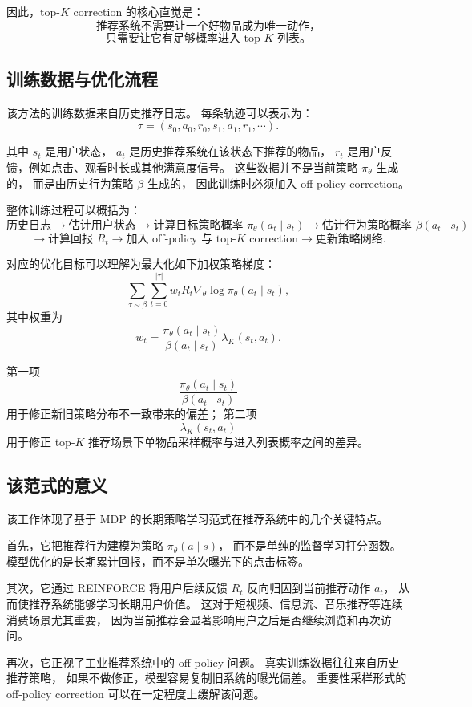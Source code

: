 \documentclass[11pt]{ctexart}
\begin{document}
因此，top-$K$ correction 的核心直觉是：
\[
\text{推荐系统不需要让一个好物品成为唯一动作，}
\]
\[
\text{只需要让它有足够概率进入 top-}K\text{ 列表。}
\]

\subsection{训练数据与优化流程}

该方法的训练数据来自历史推荐日志。
每条轨迹可以表示为：
\[
\tau=(s_0,a_0,r_0,s_1,a_1,r_1,\cdots).
\]

其中 $s_t$ 是用户状态，
$a_t$ 是历史推荐系统在该状态下推荐的物品，
$r_t$ 是用户反馈，例如点击、观看时长或其他满意度信号。
这些数据并不是当前策略 $\pi_{\theta}$ 生成的，
而是由历史行为策略 $\beta$ 生成的，
因此训练时必须加入 off-policy correction。

整体训练过程可以概括为：
\[
\text{历史日志}
\rightarrow
\text{估计用户状态}
\rightarrow
\text{计算目标策略概率 } \pi_{\theta}(a_t\mid s_t)
\rightarrow
\text{估计行为策略概率 } \beta(a_t\mid s_t)
\]
\[
\rightarrow
\text{计算回报 } R_t
\rightarrow
\text{加入 off-policy 与 top-}K\text{ correction}
\rightarrow
\text{更新策略网络}.
\]

对应的优化目标可以理解为最大化如下加权策略梯度：
\[
\sum_{\tau\sim \beta}
\sum_{t=0}^{|\tau|}
w_t
R_t
\nabla_{\theta}
\log \pi_{\theta}(a_t\mid s_t),
\]
其中权重为
\[
w_t
=
\frac{
\pi_{\theta}(a_t\mid s_t)
}{
\beta(a_t\mid s_t)
}
\lambda_K(s_t,a_t).
\]

第一项
\[
\frac{
\pi_{\theta}(a_t\mid s_t)
}{
\beta(a_t\mid s_t)
}
\]
用于修正新旧策略分布不一致带来的偏差；
第二项
\[
\lambda_K(s_t,a_t)
\]
用于修正 top-$K$ 推荐场景下单物品采样概率与进入列表概率之间的差异。

\subsection{该范式的意义}

该工作体现了基于 MDP 的长期策略学习范式在推荐系统中的几个关键特点。

首先，它把推荐行为建模为策略 $\pi_{\theta}(a\mid s)$，
而不是单纯的监督学习打分函数。
模型优化的是长期累计回报，而不是单次曝光下的点击标签。

其次，它通过 REINFORCE 将用户后续反馈 $R_t$ 反向归因到当前推荐动作 $a_t$，
从而使推荐系统能够学习长期用户价值。
这对于短视频、信息流、音乐推荐等连续消费场景尤其重要，
因为当前推荐会显著影响用户之后是否继续浏览和再次访问。

再次，它正视了工业推荐系统中的 off-policy 问题。
真实训练数据往往来自历史推荐策略，
如果不做修正，模型容易复制旧系统的曝光偏差。
重要性采样形式的 off-policy correction 可以在一定程度上缓解该问题。
\end{document}
